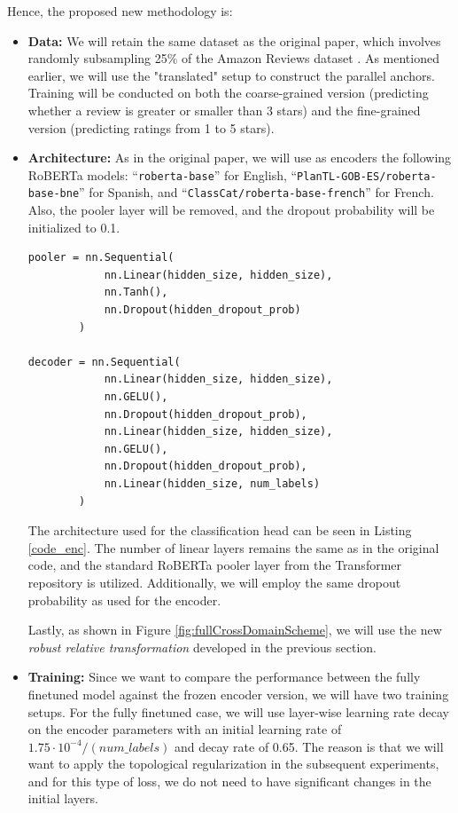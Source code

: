 \documentclass[../main.tex]{subfiles}
\begin{document}
Hence, the proposed new methodology is:
\begin{itemize}
    \item \textbf{Data:}  We will retain the same dataset as the original paper, which involves randomly subsampling 25\% of the Amazon Reviews dataset \cite{keung_multilingual_2020}. As mentioned earlier, we will use the "translated" setup to construct the parallel anchors. Training will be conducted on both the coarse-grained version (predicting whether a review is greater or smaller than 3 stars) and the fine-grained version (predicting ratings from 1 to 5 stars).
    
  
    
    \item \textbf{Architecture:} As in the original paper, we will use as encoders the following RoBERTa \cite{liu_roberta_2019} models: ``\texttt{roberta-base}'' for English, ``\texttt{PlanTL-GOB-ES/roberta-base-bne}'' for Spanish, and ``\texttt{ClassCat/roberta-base-french}'' for French. Also, the pooler layer will be removed, and the dropout probability will be initialized to 0.1.
    \begin{lstlisting}[label=code_enc, caption=Decoder Pytorch class]
pooler = nn.Sequential(
            nn.Linear(hidden_size, hidden_size),
            nn.Tanh(),
            nn.Dropout(hidden_dropout_prob)
        )
        
decoder = nn.Sequential(
            nn.Linear(hidden_size, hidden_size),
            nn.GELU(),
            nn.Dropout(hidden_dropout_prob),
            nn.Linear(hidden_size, hidden_size),
            nn.GELU(),
            nn.Dropout(hidden_dropout_prob),
            nn.Linear(hidden_size, num_labels)
        )
    \end{lstlisting}
    The architecture used for the classification head can be seen in Listing \ref{code_enc}. The number of linear layers remains the same as in the original code, and the standard RoBERTa pooler layer from the Transformer repository is utilized. Additionally, we will employ the same dropout probability as used for the encoder.

    Lastly, as shown in Figure \ref{fig:fullCrossDomainScheme}, we will use the new \emph{robust relative transformation} developed in the previous section.

    \item \textbf{Training:} Since we want to compare the performance between the fully finetuned model against the frozen encoder version, we will have two training setups. For the fully finetuned case, we will use layer-wise learning rate decay on the encoder parameters with an initial learning rate of $1.75\cdot 10^{-4}/(num\_labels)$ and decay rate of 0.65. The reason is that we will want to apply the topological regularization in the subsequent experiments, and for this type of loss, we do not need to have significant changes in the initial layers.
    

\end{itemize}
\end{document}
